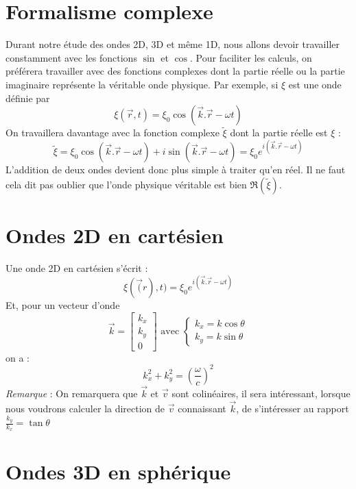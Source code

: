 \section{Formalisme complexe}

Durant notre étude des ondes 2D, 3D et même 1D, nous allons devoir travailler constamment avec les fonctions $\sin$ et $\cos$. Pour faciliter les calculs, on préférera travailler avec des fonctions complexes dont la partie réelle ou la partie imaginaire représente la véritable onde physique. Par exemple, si $\xi$ est une onde définie par
\[ \xi(\vec{r},t)=\xi_0\cos(\vec{k}.\vec{r}-\omega t) \]
On travaillera davantage avec la fonction complexe $\tilde{\xi}$ dont la partie réelle est $\xi$ :
\[ \tilde{\xi} = \xi_0\cos(\vec{k}.\vec{r}-\omega t)+i\sin(\vec{k}.\vec{r}-\omega t) = \xi_0e^{i(\vec{k}.\vec{r}-\omega t)} \]
L'addition de deux ondes devient donc plus simple à traiter qu'en réel. Il ne faut cela dit pas oublier que l'onde physique véritable est bien $\Re(\tilde{\xi})$.

\section{Ondes 2D en cartésien}
Une onde 2D en cartésien s'écrit :
\[ \xi(\vec(r),t)=\xi_0e^{i(\vec{k}.\vec{r}-\omega t)} \]
Et, pour un vecteur d'onde 
\[\vec{k}=\begin{bmatrix}k_x \\ k_y \\ 0 \end{bmatrix}
\textrm{ avec }
\left \{
\begin{array}{c}
k_x=k\cos\theta \\
k_y=k\sin\theta
\end{array}
\right.
\]
 on a : \[ k_x^2+k_y^2=\left( \frac{\omega}{c} \right)^2 \]
\emph{Remarque} : On remarquera que $\vec{k}$ et $\vec{v}$ sont colinéaires, il sera intéressant, lorsque nous voudrons calculer la direction de $\vec{v}$ connaissant $\vec{k}$, de s'intéresser au rapport $\frac{k_y}{k_x}=\tan\theta$

\section{Ondes 3D en sphérique}
